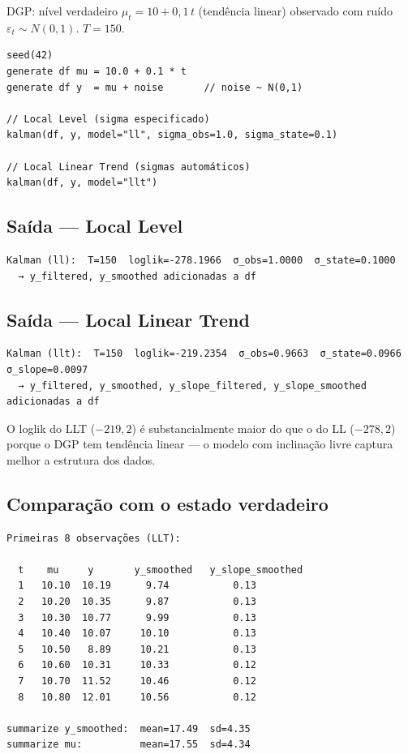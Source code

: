 DGP: nível verdadeiro $\mu_t = 10 + 0{,}1\,t$ (tendência linear) observado
com ruído $\varepsilon_t \sim N(0, 1)$. $T = 150$.

\begin{lstlisting}[caption={Filtro de Kalman: LL e LLT}]
seed(42)
generate df mu = 10.0 + 0.1 * t
generate df y  = mu + noise       // noise ~ N(0,1)

// Local Level (sigma especificado)
kalman(df, y, model="ll", sigma_obs=1.0, sigma_state=0.1)

// Local Linear Trend (sigmas automáticos)
kalman(df, y, model="llt")
\end{lstlisting}

\subsection*{Saída — Local Level}

\begin{lstlisting}[language={}, basicstyle=\ttfamily\small, frame=none,
  numbers=none, backgroundcolor=\color{codbg}]
Kalman (ll):  T=150  loglik=-278.1966  σ_obs=1.0000  σ_state=0.1000
  → y_filtered, y_smoothed adicionadas a df
\end{lstlisting}

\subsection*{Saída — Local Linear Trend}

\begin{lstlisting}[language={}, basicstyle=\ttfamily\small, frame=none,
  numbers=none, backgroundcolor=\color{codbg}]
Kalman (llt):  T=150  loglik=-219.2354  σ_obs=0.9663  σ_state=0.0966  σ_slope=0.0097
  → y_filtered, y_smoothed, y_slope_filtered, y_slope_smoothed adicionadas a df
\end{lstlisting}

O loglik do LLT ($-219{,}2$) é substancialmente maior do que o do LL
($-278{,}2$) porque o DGP tem tendência linear — o modelo com inclinação
livre captura melhor a estrutura dos dados.

\subsection*{Comparação com o estado verdadeiro}

\begin{lstlisting}[language={}, basicstyle=\ttfamily\small, frame=none,
  numbers=none, backgroundcolor=\color{codbg}]
Primeiras 8 observações (LLT):

  t    mu     y       y_smoothed   y_slope_smoothed
  1   10.10  10.19      9.74           0.13
  2   10.20  10.35      9.87           0.13
  3   10.30  10.77      9.99           0.13
  4   10.40  10.07     10.10           0.13
  5   10.50   8.89     10.21           0.13
  6   10.60  10.31     10.33           0.12
  7   10.70  11.52     10.46           0.12
  8   10.80  12.01     10.56           0.12

summarize y_smoothed:  mean=17.49  sd=4.35
summarize mu:          mean=17.55  sd=4.34
\end{lstlisting}

